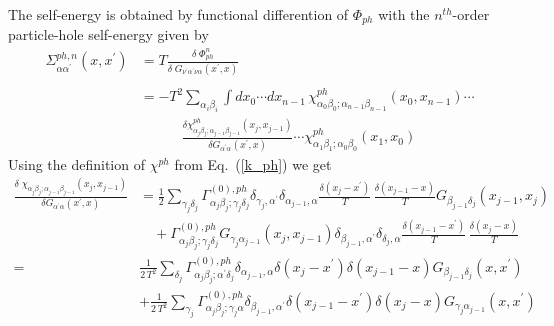 The self-energy is obtained by functional differention
of $\Phi_{ph}$ with the $n^{th}$-order particle-hole self-energy
given by
\begin{equation}
\label{sigma_ph1}
\begin{split}
\Sigma^{ph,n}_{\alpha \alpha^{\prime}}(x,x^{\prime}) & = 
T \frac{\delta\; \Phi_{ph}^n}
{\delta\; G_{\nu^{\prime}\alpha^{\prime}\nu \alpha}(x^{\prime},x)} \\
\\
& = -T^{2} \sum_{\alpha_i \beta_i}
 \int dx_0 \cdots dx_{n-1} \,
 \chi^{ph}_{\alpha_0 \beta_0; \alpha_{n-1} \beta_{n-1}}(x_0, x_{n-1}) 
 \cdots \\
& \quad \quad \quad \frac{\delta   
 \chi^{ph}_{\alpha_j \beta_j; \alpha_{j-1} \beta_{j-1}}(x_j, x_{j-1})}
 {\delta G_{\alpha^{\prime} \alpha}(x^{\prime},x)}
 \cdots
 \chi^{ph}_{\alpha_1 \beta_1; \alpha_0 \beta_0}(x_1,x_0) 
\end{split}
\end{equation}
Using the definition of $\chi^{ph}$ from Eq.~(\ref{k_ph}) we
get
\begin{equation}
\label{deriv_kph}
\begin{split}
\frac{\delta\; \chi_{\alpha_j \beta_j; \alpha_{j-1} \beta_{j-1}}(x_j, x_{j-1})}
{\delta G_{\alpha^{\prime} \alpha}(x^{\prime},x)} & = 
\frac{1}{2} \sum_{\gamma_j \delta_j} 
        \Gamma^{(0),ph}_{ \alpha_j \beta_j;\gamma_j\delta_j}
 \delta_{\gamma_j,\alpha^{\prime}}
                           \delta_{\alpha_{j-1},\alpha}
  \frac{ \delta(x_j - x^{\prime})}{T}\,
 \frac{\delta(x_{j-1} - x)}{T}
                           G_{\beta_{j-1}\delta_j}(x_{j-1},x_j) 
\\
& \quad + 
 \Gamma^{(0),ph}_{ \alpha_j \beta_j;\gamma_j\delta_j}
G_{\gamma_j \alpha_{j-1}}(x_j,x_{j-1})
                          \delta_{\beta_{j-1},\alpha^{\prime}}
                          \delta_{\delta_j,\alpha}
             \frac{\delta(x_{j-1} - x^{\prime})}{T}\,
                     \frac{\delta(x_j - x)}{T}
 \\
= &  \frac{1}{2\, T^2}
\sum_{\delta_j} 
 \Gamma^{(0),ph}_{\alpha_j \beta_j; \alpha^{\prime}\delta_j}
\delta_{\alpha_{j-1},\alpha} 
                      \delta(x_j - x^{\prime})
                      \delta(x_{j-1} - x) G_{\beta_{j-1}\delta_j}(x,x^{\prime})
\\
& + \frac{1}{2\, T^2}
\sum_{\gamma_j} 
 \Gamma^{(0),ph}_{\alpha_j\beta_j; \gamma_j \alpha }
\delta_{\beta_{j-1},\alpha^{\prime}}
                    \delta(x_{j-1} - x^{\prime}) 
                    \delta(x_j - x)
                    G_{\gamma_j \alpha_{j-1}}(x,x^{\prime})
\end{split}
\end{equation}
